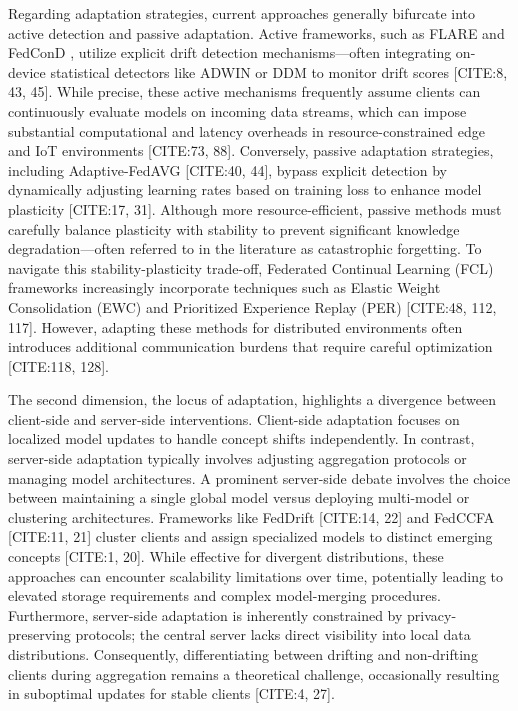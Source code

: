 \documentclass[journal]{IEEEtran}
\begin{document}
Regarding adaptation strategies, current approaches generally bifurcate into active detection and passive adaptation. Active frameworks, such as FLARE \cite{Chow2023} and FedConD \cite{Chen2021}, utilize explicit drift detection mechanisms—often integrating on-device statistical detectors like ADWIN or DDM to monitor drift scores [CITE:8, 43, 45]. While precise, these active mechanisms frequently assume clients can continuously evaluate models on incoming data streams, which can impose substantial computational and latency overheads in resource-constrained edge and IoT environments [CITE:73, 88]. Conversely, passive adaptation strategies, including Adaptive-FedAVG [CITE:40, 44], bypass explicit detection by dynamically adjusting learning rates based on training loss to enhance model plasticity [CITE:17, 31]. Although more resource-efficient, passive methods must carefully balance plasticity with stability to prevent significant knowledge degradation—often referred to in the literature as catastrophic forgetting. To navigate this stability-plasticity trade-off, Federated Continual Learning (FCL) frameworks increasingly incorporate techniques such as Elastic Weight Consolidation (EWC) and Prioritized Experience Replay (PER) [CITE:48, 112, 117]. However, adapting these methods for distributed environments often introduces additional communication burdens that require careful optimization [CITE:118, 128].

The second dimension, the locus of adaptation, highlights a divergence between client-side and server-side interventions. Client-side adaptation focuses on localized model updates to handle concept shifts independently. In contrast, server-side adaptation typically involves adjusting aggregation protocols or managing model architectures. A prominent server-side debate involves the choice between maintaining a single global model versus deploying multi-model or clustering architectures. Frameworks like FedDrift [CITE:14, 22] and FedCCFA [CITE:11, 21] cluster clients and assign specialized models to distinct emerging concepts [CITE:1, 20]. While effective for divergent distributions, these approaches can encounter scalability limitations over time, potentially leading to elevated storage requirements and complex model-merging procedures. Furthermore, server-side adaptation is inherently constrained by privacy-preserving protocols; the central server lacks direct visibility into local data distributions. Consequently, differentiating between drifting and non-drifting clients during aggregation remains a theoretical challenge, occasionally resulting in suboptimal updates for stable clients [CITE:4, 27].
\end{document}
